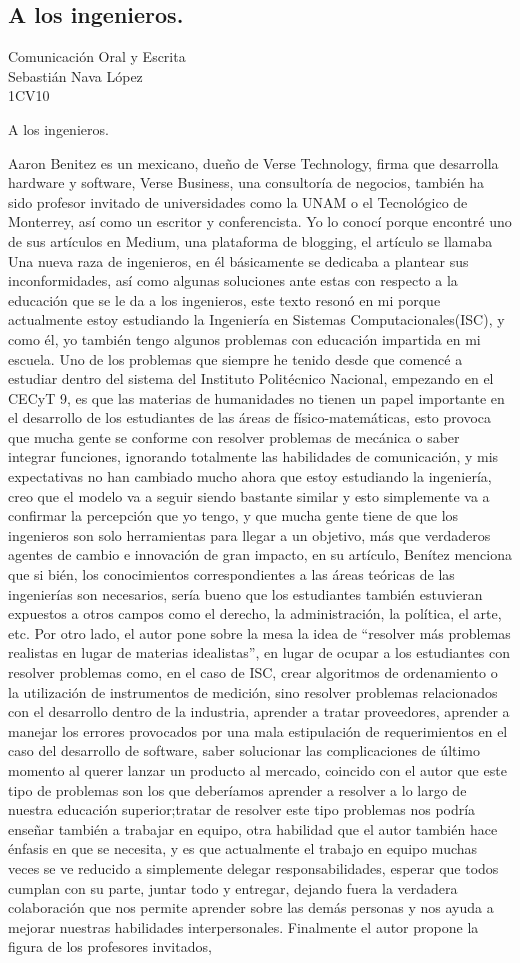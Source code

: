 \documentclass[a4paper,12pt]{article}
\newcommand{\titlehomework}[4]{\begin{center}\section*{#4}{\large #2}\\#1\\#3\\[2ex]\end{center}}
\begin{document}
 \titlehomework{Sebastián Nava López}{Comunicación Oral y Escrita}{1CV10}{A los ingenieros.}
 A los ingenieros.


Aaron Benitez es un mexicano, dueño de Verse Technology, firma que desarrolla hardware y software,  Verse Business, una consultoría de negocios, también ha sido profesor invitado de universidades como la UNAM o el Tecnológico de Monterrey, así como un escritor y conferencista. Yo lo conocí porque encontré uno de sus artículos en Medium, una plataforma de blogging, el artículo se llamaba Una nueva raza de ingenieros, en él básicamente se dedicaba a plantear sus inconformidades, así como algunas soluciones ante estas con respecto a la educación que se le da a los ingenieros, este texto resonó en mi porque actualmente estoy estudiando la Ingeniería en Sistemas Computacionales(ISC), y como él, yo también tengo algunos problemas con educación impartida en mi escuela. Uno de los problemas que siempre he tenido desde que comencé a estudiar dentro del sistema del Instituto Politécnico Nacional, empezando en el CECyT 9, es que las materias de humanidades no tienen un papel importante en el desarrollo de los estudiantes de las áreas de físico-matemáticas, esto provoca que mucha gente se conforme con resolver problemas de mecánica o saber integrar funciones, ignorando totalmente las habilidades de comunicación, y mis expectativas no han cambiado mucho ahora que estoy estudiando la ingeniería, creo que el modelo va a seguir siendo bastante similar y esto simplemente va a confirmar la percepción que yo tengo, y que mucha gente tiene de que los ingenieros son solo herramientas para llegar a un objetivo, más que verdaderos agentes de cambio e innovación de gran impacto, en su artículo, Benítez menciona que si bién, los conocimientos correspondientes a las áreas teóricas de las ingenierías son necesarios, sería bueno que los estudiantes también estuvieran expuestos a otros campos como el derecho, la administración, la política, el arte, etc. Por otro lado, el autor pone sobre la mesa la idea de “resolver más problemas realistas en lugar de materias idealistas”, en lugar de ocupar a los estudiantes con resolver problemas como, en el caso de ISC, crear algoritmos de ordenamiento o la utilización de instrumentos de medición, sino resolver problemas relacionados con el desarrollo dentro de la industria, aprender a tratar proveedores, aprender a manejar los errores provocados por una mala estipulación de requerimientos en el caso del desarrollo de software, saber solucionar las complicaciones de último momento al querer lanzar un producto al mercado, coincido con el autor que este tipo de problemas son los que deberíamos aprender a resolver a lo largo de nuestra educación superior;tratar de resolver este tipo problemas nos podría enseñar también a trabajar en equipo, otra habilidad que el autor también hace énfasis en que se necesita, y es que actualmente el trabajo en equipo muchas veces se ve reducido a simplemente delegar responsabilidades, esperar que todos cumplan con su parte, juntar todo y entregar, dejando fuera la verdadera colaboración que nos permite aprender sobre las demás personas y nos ayuda a mejorar nuestras habilidades interpersonales. Finalmente el autor propone la figura de los profesores invitados, 
\end{document}

